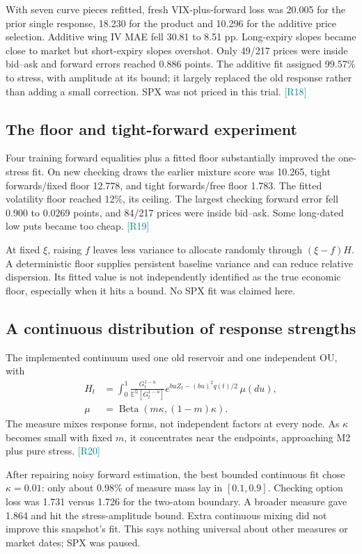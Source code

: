 \documentclass[11pt,a4paper]{article}
\newcommand{\E}{\mathbb E^{\mathbb Q}}
\newcommand{\src}[1]{\textcolor{teal}{\small[#1]}}
\begin{document}
With seven curve pieces refitted, fresh VIX-plus-forward loss was 20.005 for the prior single response, 18.230 for the product and 10.296 for the additive price selection. Additive wing IV MAE fell 30.81 to 8.51 pp. Long-expiry slopes became close to market but short-expiry slopes overshot. Only 49/217 prices were inside bid--ask and forward errors reached 0.886 points. The additive fit assigned 99.57\% to stress, with amplitude at its bound; it largely replaced the old response rather than adding a small correction. SPX was not priced in this trial. \src{R18}

\subsection{The floor and tight-forward experiment}
Four training forward equalities plus a fitted floor substantially improved the one-stress fit. On new checking draws the earlier mixture score was 10.265, tight forwards/fixed floor 12.778, and tight forwards/free floor 1.783. The fitted volatility floor reached 12\%, its ceiling. The largest checking forward error fell 0.900 to 0.0269 points, and 84/217 prices were inside bid--ask. Some long-dated low puts became too cheap. \src{R19}

At fixed $\xi$, raising $f$ leaves less variance to allocate randomly through $(\xi-f)H$. A deterministic floor supplies persistent baseline variance and can reduce relative dispersion. Its fitted value is not independently identified as the true economic floor, especially when it hits a bound. No SPX fit was claimed here.

\subsection{A continuous distribution of response strengths}
The implemented continuum used one old reservoir and one independent OU, with
\begin{align}
H_t&=\int_0^1\frac{G_t^{1-u}}{\E[G_t^{1-u}]}
 e^{buZ_t-(bu)^2q(t)/2}\,\mu(du),\\
\mu&=\operatorname{Beta}(m\kappa,(1-m)\kappa).
\end{align}
The measure mixes response forms, not independent factors at every node. As $\kappa$ becomes small with fixed $m$, it concentrates near the endpoints, approaching M2 plus pure stress. \src{R20}

After repairing noisy forward estimation, the best bounded continuous fit chose $\kappa=0.01$: only about 0.98\% of measure mass lay in $[0.1,0.9]$. Checking option loss was 1.731 versus 1.726 for the two-atom boundary. A broader measure gave 1.864 and hit the stress-amplitude bound. Extra continuous mixing did not improve this snapshot's fit. This says nothing universal about other measures or market dates; SPX was paused.
\end{document}
